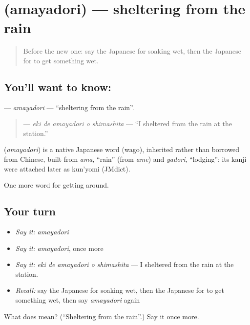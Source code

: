 \section[\texorpdfstring{\ja{あまやどり} (amayadori)}{あまやどり (amayadori)}]{ (amayadori) — sheltering from the rain}

\label{lesson:JA-C415-amayadori}



\begin{quote}
Before the new one: say the Japanese for soaking wet, then the Japanese for to get something wet.
\end{quote}

\subsection*{You'll want to know: }
\textbf{} — \emph{amayadori} — \textquotedblleft{}sheltering from the rain\textquotedblright{}.

\begin{quote}
\textbf{  } — \emph{eki de amayadori o shimashita} — \textquotedblleft{}I sheltered from the rain at the station.\textquotedblright{}
\end{quote}

\begin{cousinweb}
\textbf{} (\emph{amayadori}) is a native Japanese word (wago), inherited rather than borrowed from Chinese, built from \emph{ama}, \textquotedblleft{}rain\textquotedblright{} (from \emph{ame}) and \emph{yadori}, \textquotedblleft{}lodging\textquotedblright{}; its kanji were attached later as kun'yomi (JMdict).
\end{cousinweb}

\begin{grammarlens}[title={What you've built}]
One more word for getting around.
\end{grammarlens}

\subsection*{Your turn}
\begin{itemize}
\raggedright
  \item \emph{Say it:} \emph{amayadori}
  \item \emph{Say it:} \emph{amayadori}, once more
  \item \emph{Say it:} \emph{eki de amayadori o shimashita} — I sheltered from the rain at the station.
  \item \emph{Recall:} say the Japanese for soaking wet, then the Japanese for to get something wet, then say \emph{amayadori} again
\end{itemize}

\begin{tcolorbox}[breakable,colback=teal!4,colframe=teal!35!black,title={Before you move on}]
What does  mean? (\textquotedblleft{}Sheltering from the rain\textquotedblright{}.) Say it once more.
\end{tcolorbox}
